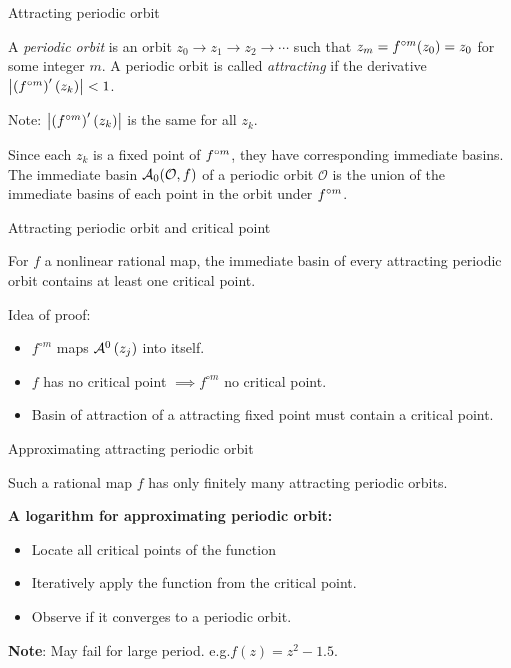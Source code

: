 \begin{frame}{Attracting periodic orbit}
    \begin{definition}

        A \emph{periodic orbit} is an orbit $z_0 \rightarrow z_1 \rightarrow z_2 \rightarrow \cdots $ such that $z_m =f^{\circ m}(z_0)=z_0$ for some integer $m$. A periodic orbit is called \emph{attracting} if the derivative $\left|\left(f^{\circ m}\right)'\left(z_{k}\right)\right|<1$. 
    \end{definition}
    
    Note:  $\left|\left(f^{\circ m}\right)'\left(z_{k}\right)\right|$ is the same for all $z_{k}$.
    
    \begin{definition}
    Since each $z_k$ is a fixed point of $f^{\circ m}$, they have corresponding immediate basins. The immediate basin $\mathcal{A}_0(\mathcal{O}, f)$ of a periodic orbit $\mathcal{O}$ is the union of the immediate basins of each point in the orbit under $f^{\circ m}$.
    \end{definition}
    
\end{frame}

\begin{frame}{Attracting periodic orbit and critical point}
    \begin{theorem}
        For $f$ a nonlinear rational map, the immediate basin of every attracting periodic orbit contains at least one critical point.
    \end{theorem}
    
    Idea of proof: 
    
    \begin{itemize}
        \item $f^{\circ m}$ maps $\mathcal{A}^{0}\left(z_{j}\right)$ into itself. 
        \item $f$ has no critical point $\implies f^{\circ m}$ no critical point.
        \item Basin of attraction of a attracting fixed point must contain a critical point.
    \end{itemize}
\end{frame}
\begin{frame}{Approximating attracting periodic orbit}
    \begin{cor}
    \label{8:cor:orbfin}
    Such a rational map $f$ has only finitely many attracting periodic orbits.
    \end{cor}   
    
    \textbf{A logarithm for approximating periodic orbit:} 
    
    \begin{itemize}
        \item Locate all critical points of the function
        \item Iteratively apply the function from the critical point.
        \item Observe if it converges to a periodic orbit.
    \end{itemize}
    
    \textbf{Note}: May fail for large period. e.g.$f(z)=z^2-1.5$.
\end{frame}


